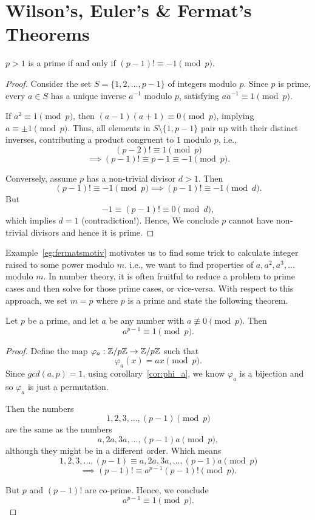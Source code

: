\section{Wilson's, Euler's \& Fermat's Theorems}
\begin{theorem}
    $p>1$ is a prime if and only if $(p-1)! \equiv -1 \pmod{p}$.
\end{theorem}
\begin{proof}
    Consider the set \( S = \{1, 2, \dots, p-1\} \) of integers modulo \( p \). Since \( p \) is prime, every \( a \in S \) has a unique inverse \( a^{-1} \) modulo \( p \), satisfying \( a a^{-1} \equiv 1 \pmod{p} \). 

    If \( a^2 \equiv 1 \pmod{p} \), then \( (a-1)(a+1) \equiv 0 \pmod{p} \), implying \( a \equiv \pm 1 \pmod{p} \). Thus, all elements in \( S \setminus \{1, p-1\} \) pair up with their distinct inverses, contributing a product congruent to \( 1 \) modulo \( p \), i.e.,
    \[
    (p-2)! \equiv 1 \pmod{p}
    \]
    \[
    \implies (p-1)! \equiv p-1 \equiv -1 \pmod{p}.
    \]

    Conversely, assume $p$ has a non-trivial divisor $d>1$. Then \[(p-1)! \equiv -1 \pmod{p} \implies (p-1)! \equiv -1 \pmod{d}.\]
    But \[-1 \equiv (p-1)! \equiv 0 \pmod{d},\] which implies $d = 1$ (contradiction!). Hence, We conclude $p$ cannot have non-trivial divisors and hence it is prime.
\end{proof}

Example~\ref{eg:fermatsmotiv} motivates us to find some trick to calculate integer raised to some power modulo $m$. i.e., we want to find properties of $a, a^2, a^3, ...$ modulo $m$. In number theory, it is often fruitful to reduce a problem to prime cases and then solve for those prime cases, or vice-versa. With respect to this approach, we set $m=p$ where $p$ is a prime and state the following theorem.

\begin{theorem}
    Let $p$ be a prime, and let $a$ be any number with $a \not\equiv 0 \pmod{p}$. Then \[a^{p-1} \equiv 1 \pmod{p}.\]
\end{theorem}
\begin{proof}
    Define the map $\varphi_a: \mathbb{Z}/p\mathbb{Z} \rightarrow \mathbb{Z}/p\mathbb{Z}$ such that \[\varphi_a(x) = ax \pmod{p}.\] Since $gcd(a,p) = 1$, using corollary~\ref{cor:phi_a}, we know $\varphi_a$ is a bijection and so $\varphi_a$ is just a permutation.

    Then the numbers \[1,2,3, ..., (p-1) \pmod{p}\] are the same as the numbers \[a,2a,3a, ..., (p-1)a \pmod{p},\]
    although they might be in a different order. Which means \[1,2,3, ..., (p-1) \equiv a,2a,3a, ..., (p-1)a \pmod{p}\] \[\implies (p-1)! \equiv a^{p-1}(p-1)! \pmod{p}.\]

    But $p$ and $(p-1)!$ are co-prime. Hence, we conclude \[a^{p-1} \equiv 1 \pmod{p}.\]
\end{proof}

